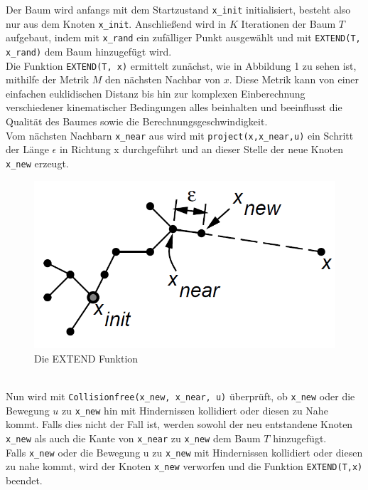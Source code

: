 Der Baum wird anfangs mit dem Startzustand \verb|x_init| initialisiert, besteht also nur aus dem Knoten \verb|x_init|. Anschließend wird in $K$ Iterationen der Baum $T$ aufgebaut, indem mit \verb|x_rand| ein zufälliger Punkt ausgewählt und mit \verb|EXTEND(T, x_rand)| dem Baum hinzugefügt wird. \\

Die Funktion \verb|EXTEND(T, x)| ermittelt zunächst, wie in Abbildung 1 zu sehen ist, mithilfe der Metrik $M$ den nächsten Nachbar von $x$. Diese Metrik kann von einer einfachen euklidischen Distanz bis hin zur komplexen Einberechnung verschiedener kinematischer Bedingungen alles beinhalten und beeinflusst die Qualität des Baumes sowie die Berechnungsgeschwindigkeit. \\
Vom nächsten Nachbarn \verb|x_near| aus wird mit \verb|project(x,x_near,u)| ein Schritt der Länge  $\epsilon$ in Richtung x durchgeführt und an dieser Stelle der neue Knoten \verb|x_new| erzeugt. 
\begin{figure}
\centering
\includegraphics[scale=0.5]{Bilder/Extend.png} 
\caption{Die EXTEND Funktion \citep{Lav00} }
\label{fig3}
\end{figure} \\
Nun wird mit \verb|Collisionfree(x_new, x_near, u)| überprüft, ob \verb|x_new| oder die Bewegung $u$ zu \verb|x_new| hin mit Hindernissen kollidiert oder diesen zu Nahe kommt. Falls dies nicht der Fall ist, werden sowohl der neu entstandene Knoten \verb|x_new| als auch die Kante von \verb|x_near| zu \verb|x_new| dem Baum $T$ hinzugefügt. \\
Falls  \verb|x_new| oder die Bewegung u zu  \verb|x_new| mit Hindernissen kollidiert oder diesen zu nahe kommt, wird der Knoten  \verb|x_new| verworfen und die Funktion \verb|EXTEND(T,x)| beendet.\\

